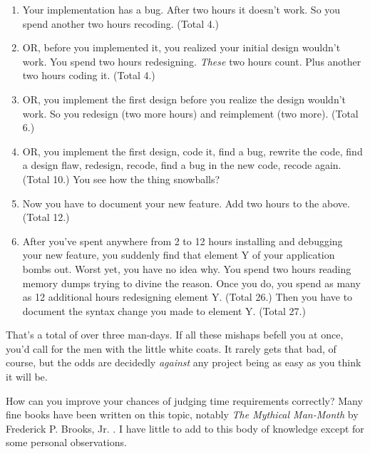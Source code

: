 \begin{enumerate}
\item Your implementation has a bug. After two hours it doesn't work.
So you spend another two hours recoding. (Total 4.)
\item OR, before you implemented it, you realized your initial design
wouldn't work. You spend two hours redesigning. \emph{These} two hours
count. Plus another two hours coding it. (Total 4.)
\item OR, you implement the first design before you realize the design
wouldn't work. So you redesign (two more hours) and reimplement (two
more). (Total 6.)
\item OR, you implement the first design, code it, find a bug, rewrite
the code, find a design flaw, redesign, recode, find a bug in the new
code, recode again. (Total 10.)
You see how the thing snowballs?
\item Now you have to document your new feature. Add two hours to the
above. (Total 12.)
\item After you've spent anywhere from 2 to 12 hours installing and
debugging your new feature, you suddenly find that element Y of your
application bombs out. Worst yet, you have no idea why. You spend two
hours reading memory dumps trying to divine the reason. Once you do,
you spend as many as 12 additional hours redesigning element Y. (Total
26.) Then you have to document the syntax change you made to element
Y. (Total 27.)
\end{enumerate}

\noindent That's a total of over three man-days. If all these mishaps
befell you at once, you'd call for the men with the little white
coats. It rarely gets that bad, of course, but the odds are decidedly
\emph{against} any project being as easy as you think it will be.

How can you improve your chances of judging time requirements
correctly? Many fine books have been written on this topic, notably
\emph{The Mythical Man-Month} by Frederick P. Brooks, Jr. \cite{brooks75}.%
%
I have little to add to this body of knowledge except for some
personal observations.

